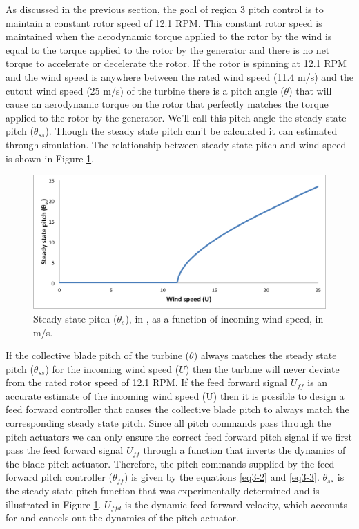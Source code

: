 As discussed in the previous section, the goal of region 3 pitch control is to maintain a constant rotor speed of 12.1 RPM. This constant rotor speed is maintained when the aerodynamic torque applied to the rotor by the wind is equal to the torque applied to the rotor by the generator and there is no net torque to accelerate or decelerate the rotor. If the rotor is spinning at 12.1 RPM and the wind speed is anywhere between the rated wind speed (11.4 m/s) and the cutout wind speed (25 m/s) of the turbine there is a pitch angle ($\theta$) that will cause an aerodynamic torque on the rotor that perfectly matches the torque applied to the rotor by the generator. We'll call this pitch angle the steady state pitch ($\theta_{ss}$). Though the steady state pitch can't be calculated it can estimated through simulation. The relationship between steady state pitch and wind speed is shown in Figure \ref{fig3-11}.

 \begin{figure}[htbp]
	\centering
		\includegraphics[width=\linewidth]{Figures/ch3Figures/fig3-11.png}
		
	\caption{Steady state pitch ($\theta_{s}$), in \degree, as a function of incoming wind speed, in m/s.}
	\label{fig3-11}
\end{figure}

If the collective blade pitch of the turbine ($\theta$) always matches the steady state pitch ($\theta_{ss}$) for the incoming wind speed ($U$) then the turbine will never deviate from the rated rotor speed of 12.1 RPM. If the feed forward signal $U_{ff}$ is an accurate estimate of the incoming wind speed (U) then it is possible to design a feed forward controller that causes the collective blade pitch to always match the corresponding steady state pitch. Since all pitch commands pass through the pitch actuators we can only ensure the correct feed forward pitch signal if we first pass the feed forward signal $U_{ff}$ through a function that inverts the dynamics of the blade pitch actuator. Therefore, the pitch commands supplied by the feed forward pitch controller ($\theta_{ff}$) is given by the equations \ref{eq3-2} and \ref{eq3-3}. $\theta_{ss}$ is the steady state pitch function that was experimentally determined and is illustrated in Figure \ref{fig3-11}. $U_{ffd}$ is the dynamic feed forward velocity, which accounts for and cancels out the dynamics of the pitch actuator.

